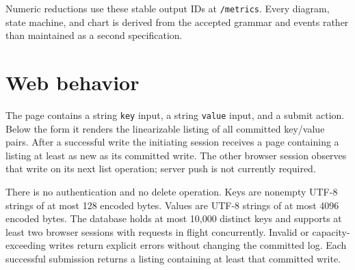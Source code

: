 Numeric reductions use these stable output IDs at \texttt{/metrics}.
Every diagram, state machine, and chart is derived from the accepted
grammar and events rather than maintained as a second specification.

\hypertarget{web-behavior}{%
\section{Web behavior}\label{web-behavior}}

The page contains a string \texttt{key} input, a string \texttt{value}
input, and a submit action. Below the form it renders the linearizable
listing of all committed key/value pairs. After a successful write the
initiating session receives a page containing a listing at least as new
as its committed write. The other browser session observes that write on
its next list operation; server push is not currently required.

There is no authentication and no delete operation. Keys are nonempty
UTF-8 strings of at most 128 encoded bytes. Values are UTF-8 strings of
at most 4096 encoded bytes. The database holds at most 10,000 distinct
keys and supports at least two browser sessions with requests in flight
concurrently. Invalid or capacity-exceeding writes return explicit
errors without changing the committed log. Each successful submission
returns a listing containing at least that committed write.
